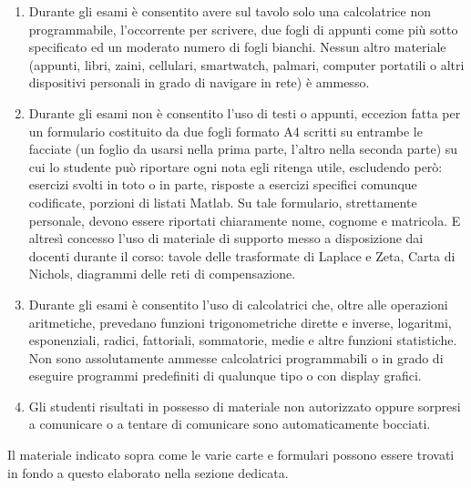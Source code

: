 \documentclass[../main.tex]{subfiles}
\begin{document}
\begin{enumerate}
	\item[\textbf{-}] Durante gli esami è consentito avere sul tavolo solo una calcolatrice non programmabile, l'occorrente per scrivere, due fogli di appunti come più sotto specificato ed un moderato numero di fogli bianchi. Nessun altro materiale (appunti, libri, zaini, cellulari, smartwatch, palmari, computer portatili o altri dispositivi personali in grado di navigare in rete) è ammesso. 
	
	\item[\textbf{-}] Durante gli esami non è consentito l'uso di testi o appunti, eccezion fatta per un formulario costituito da due fogli formato A4 scritti su entrambe le facciate (un foglio da usarsi nella prima parte, l'altro nella seconda parte) su cui lo studente può riportare ogni nota egli ritenga utile, escludendo però: esercizi svolti in toto o in parte, risposte a esercizi specifici comunque codificate, porzioni di listati Matlab. Su tale formulario, strettamente personale, devono essere riportati chiaramente nome, cognome e matricola. E altresì concesso l'uso di materiale di supporto messo a disposizione dai docenti durante il corso: tavole delle trasformate di Laplace e Zeta, Carta di Nichols, diagrammi delle reti di compensazione.
	
	\item[\textbf{-}] Durante gli esami è consentito l'uso di calcolatrici che, oltre alle operazioni aritmetiche, prevedano funzioni trigonometriche dirette e inverse, logaritmi, esponenziali, radici, fattoriali, sommatorie, medie e altre funzioni statistiche. Non sono assolutamente ammesse calcolatrici programmabili o in grado di eseguire programmi predefiniti di qualunque tipo o con display grafici.
	
	\item[\textbf{-}] Gli studenti risultati in possesso di materiale non autorizzato oppure sorpresi a comunicare o a tentare di comunicare sono automaticamente bocciati.
	
\end{enumerate}

Il materiale indicato sopra come le varie carte e formulari possono essere trovati in fondo a questo elaborato nella sezione dedicata.
\end{document}
